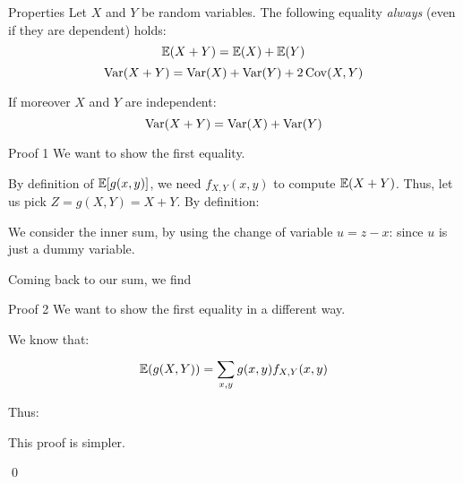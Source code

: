 \documentclass[a4paper]{article}
\begin{document}
\begin{parag}{Properties}
    Let $X$ and $Y$ be random variables. The following equality \textit{always} (even if they are dependent) holds: 
    \[\exval\left(X + Y\right) = \exval\left(X\right) + \exval\left(Y\right)\]
    \[\Var\left(X + Y\right) = \Var\left(X\right) + \Var\left(Y\right) + 2\Cov\left(X, Y\right)\]
    
    If moreover $X$ and $Y$ are independent: 
    \[\Var\left(X + Y\right) = \Var\left(X\right) + \Var\left(Y\right)\]
    
    \begin{subparag}{Proof 1}
        We want to show the first equality.

        By definition of $\exval\left[g\left(x, y\right)\right]$, we need $f_{X, Y}\left(x, y\right)$ to compute $\exval\left(X + Y\right)$. Thus, let us pick $Z = g\left(X, Y\right) = X + Y$. By definition: 
        
        We consider the inner sum, by using the change of variable $u = z - x$: 
        since $u$ is just a dummy variable.

        Coming back to our sum, we find 
    \end{subparag}

    \begin{subparag}{Proof 2}
        We want to show the first equality in a different way.

        We know that:
        \[\exval\left(g\left(X, Y\right)\right) = \sum_{x, y}^{} g\left(x, y\right)f_{X, Y}\left(x, y\right)\]
        
        Thus: 
        
        This proof is simpler.

        \qed
    \end{subparag}
\end{parag}
\end{document}

